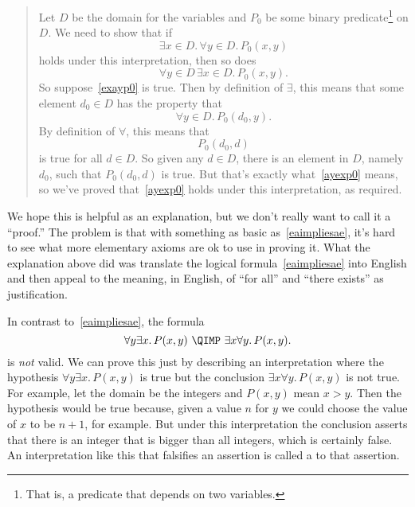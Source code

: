 \begin{quote}
Let $D$ be the domain for the variables and $P_0$ be some
binary predicate\footnote{That is, a predicate that depends on two variables.}
on $D$.  We need to show that if
\begin{equation}\label{exayp0}
\exists x \in D.\, \forall y \in D.\, P_0(x,y)
\end{equation}
holds under this interpretation, then so does
\begin{equation}\label{ayexp0}
\forall y \in D\, \exists x \in D.\, P_0(x,y).
\end{equation}
So suppose~\eqref{exayp0} is true.  Then by definition of $\exists$, this
means that some element $d_0 \in D$ has the property that
\[
\forall y \in D.\, P_0(d_0, y).
\]
By definition of $\forall$, this means that
\[
P_0(d_0,d)
\]
is true for all $d \in D$.  So given any $d \in D$, there is an element in
$D$, namely $d_0$, such that $P_0(d_0,d)$ is true.  But that's exactly
what~\eqref{ayexp0} means, so we've proved that~\eqref{ayexp0} holds under
this interpretation, as required.
\end{quote}

We hope this is helpful as an explanation, but we don't really want to
call it a ``proof.''  The problem is that with something as basic
as~\eqref{eaimpliesae}, it's hard to see what more elementary axioms
are ok to use in proving it.  What the explanation above did was
translate the logical formula~\eqref{eaimpliesae} into English and
then appeal to the meaning, in English, of ``for all'' and ``there
exists'' as justification.

\iffalse So this wasn't a proof, just an explanation intended to make
clear what~\eqref{eaimpliesae} means.\fi

In contrast to~\eqref{eaimpliesae}, the formula
\begin{equation}\label{aenotimplyea}
\forall y \exists x.\, P(x,y)\ \QIMP\ \exists x \forall y.\, P(x,y).
\end{equation}
is \emph{not} valid.  We can prove this just by describing an
interpretation where the hypothesis $\forall y \exists x.\, P(x,y)$ is
true but the conclusion $\exists x \forall y.\, P(x,y)$ is not true.
For example, let the domain be the integers and $P(x,y)$ mean $x > y$.
Then the hypothesis would be true because, given a value $n$ for $y$ we
could choose the value of $x$ to be $n+1$, for example.  But under this
interpretation the conclusion asserts that there is an integer that is
bigger than all integers, which is certainly false.  An interpretation
like this that falsifies an assertion is called a  to
that assertion.

